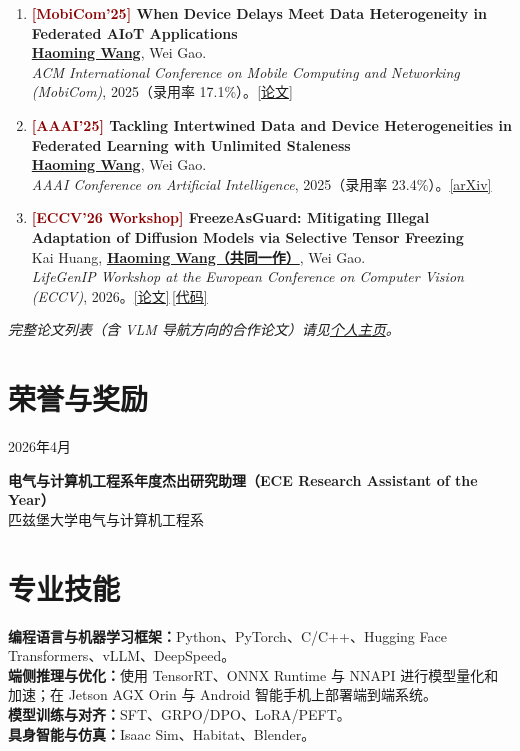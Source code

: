 \documentclass[10pt,letterpaper,fontset=fandol]{ctexart}
\newenvironment{datedentry}[1]{%
  \par\noindent
  \begin{minipage}[t]{3.0cm}\raggedright\small #1\end{minipage}%
  \hspace{0.25cm}%
  \begin{minipage}[t]{\dimexpr\linewidth-3.25cm\relax}\raggedright
}{\end{minipage}\par\vspace{3pt}}
\newenvironment{publist}{
  \begin{enumerate}[leftmargin=1.65em,itemsep=3pt,parsep=0pt,topsep=2pt,
                    label=\arabic*.,ref=\arabic*,series=pubs]
}{\end{enumerate}}
\newcommand{\me}{\underline{\textbf{Haoming Wang}}}
\newcommand{\meco}{\underline{\textbf{Haoming Wang（共同一作）}}}
\begin{document}
\begin{publist}
\item\label{pub:feddc} \textbf{\textcolor{darkred}{[MobiCom'25]} When Device Delays Meet Data Heterogeneity in Federated AIoT Applications}\\
\me, Wei Gao.\\
\textit{ACM International Conference on Mobile Computing and Networking (MobiCom)}, 2025（录用率 17.1\%）。\href{https://haomingwang645.github.io/pdfs/feddc_paper.pdf}{[论文]}

\item\label{pub:aaai} \textbf{\textcolor{darkred}{[AAAI'25]} Tackling Intertwined Data and Device Heterogeneities in Federated Learning with Unlimited Staleness}\\
\me, Wei Gao.\\
\textit{AAAI Conference on Artificial Intelligence}, 2025（录用率 23.4\%）。\href{https://arxiv.org/abs/2309.13536}{[arXiv]}

\item\label{pub:freeze} \textbf{\textcolor{darkred}{[ECCV'26 Workshop]} FreezeAsGuard: Mitigating Illegal Adaptation of Diffusion Models via Selective Tensor Freezing}\\
Kai Huang, \meco, Wei Gao.\\
\textit{LifeGenIP Workshop at the European Conference on Computer Vision (ECCV)}, 2026。\href{https://haomingwang645.github.io/pdfs/freezeasguard_paper.pdf}{[论文]}\,\href{https://github.com/pittisl/FreezeAsGuard}{[代码]}
\end{publist}

\vspace{1pt}
\small\textit{完整论文列表（含 VLM 导航方向的合作论文）请见\href{https://haomingwang645.github.io/}{个人主页}。}
\normalsize

\section{荣誉与奖励}

\begin{datedentry}{2026年4月}
\textbf{电气与计算机工程系年度杰出研究助理（ECE Research Assistant of the Year）}\\
匹兹堡大学电气与计算机工程系
\end{datedentry}

\section{专业技能}
\textbf{编程语言与机器学习框架：}Python、PyTorch、C/C++、Hugging Face Transformers、vLLM、DeepSpeed。\\
\textbf{端侧推理与优化：}使用 TensorRT、ONNX Runtime 与 NNAPI 进行模型量化和加速；在 Jetson AGX Orin 与 Android 智能手机上部署端到端系统。\\
\textbf{模型训练与对齐：}SFT、GRPO/DPO、LoRA/PEFT。\\
\textbf{具身智能与仿真：}Isaac Sim、Habitat、Blender。
\end{document}
